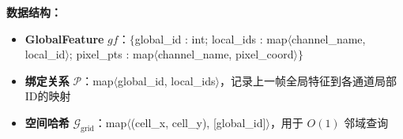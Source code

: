 \documentclass[preview]{standalone}
\begin{document}
\vspace{0.5em}
\noindent\textbf{数据结构：}

\begin{itemize}
    \item \textbf{GlobalFeature} $gf$：$\{$global\_id : int; local\_ids : map$\langle$channel\_name, local\_id$\rangle$; pixel\_pts : map$\langle$channel\_name, pixel\_coord$\rangle\}$
    \item \textbf{绑定关系} $\mathcal{P}$：map$\langle$global\_id, local\_ids$\rangle$，记录上一帧全局特征到各通道局部ID的映射
    \item \textbf{空间哈希} $\mathcal{G}_{\text{grid}}$：map$\langle$(cell\_x, cell\_y), [global\_id]$\rangle$，用于 $O(1)$ 邻域查询
\end{itemize}
\end{document}
